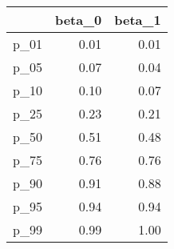 \begin{table}[ht]
\centering
\begin{tabular}{rrr}
  \hline
 & beta\_0 & beta\_1 \\ 
  \hline
p\_01 & 0.01 & 0.01 \\ 
  p\_05 & 0.07 & 0.04 \\ 
  p\_10 & 0.10 & 0.07 \\ 
  p\_25 & 0.23 & 0.21 \\ 
  p\_50 & 0.51 & 0.48 \\ 
  p\_75 & 0.76 & 0.76 \\ 
  p\_90 & 0.91 & 0.88 \\ 
  p\_95 & 0.94 & 0.94 \\ 
  p\_99 & 0.99 & 1.00 \\ 
   \hline
\end{tabular}
\end{table}

